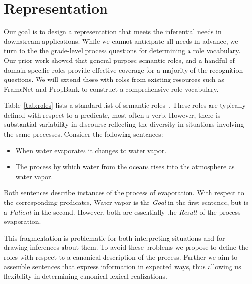 \section{Representation}
\label{sec:schemas}

Our goal is to design a representation that meets the inferential needs in downstream applications. 
While we cannot anticipate all needs in advance, we turn to the the grade-level process questions for determining a role vocabulary.
Our prior work showed that general purpose semantic roles, and a handful of domain-specific 
roles provide effective coverage for a majority of the recognition questions. 
We will extend these with roles from existing resources such as FrameNet and PropBank to construct a comprehensive role vocabulary.

Table~\ref{tab:roles} lists a standard list of semantic roles~\cite{}. These roles are typically defined with respect to a predicate, most often a verb.
However, there is substantial variability in discourse reflecting the diversity in situations involving the same processes. 
Consider the following sentences:
\begin{itemize}
\item When water evaporates it changes to water vapor. 
\item The process by which water from the oceans rises into the atmosphere as water vapor. 
\end{itemize}

Both sentences describe instances of the process of evaporation. 
With respect to the corresponding predicates, Water vapor is the {\em Goal} in the first sentence, but is a {\em Patient} in the second. 
However, both are essentially the {\em Result} of the process evaporation. 

This fragmentation is problematic for both interpreting situations and for drawing inferences about them. 
To avoid these problems we propose to define the roles with respect to a canonical description of the process. 
Further we aim to assemble sentences that express information in expected ways, thus allowing us 
flexibility in determining canonical lexical realizations.


